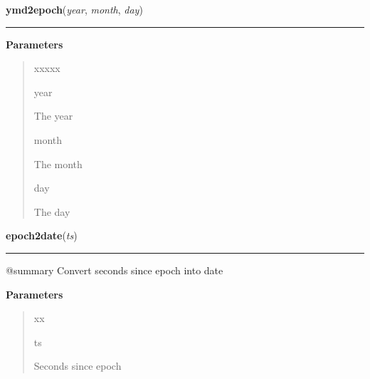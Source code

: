 \hspace{.8\funcindent}\begin{boxedminipage}{\funcwidth}

    \raggedright \textbf{ymd2epoch}(\textit{year}, \textit{month}, \textit{day})

    \vspace{-1.5ex}

    \rule{\textwidth}{0.5\fboxrule}
\setlength{\parskip}{2ex}
\setlength{\parskip}{1ex}
      \textbf{Parameters}
      \vspace{-1ex}

      \begin{quote}
        \begin{Ventry}{xxxxx}

          \item[year]

          The year

          \item[month]

          The month

          \item[day]

          The day

        \end{Ventry}

      \end{quote}

    \end{boxedminipage}

    \label{trunk:qstkutil:dateutil:epoch2date}

    \vspace{0.5ex}

\hspace{.8\funcindent}\begin{boxedminipage}{\funcwidth}

    \raggedright \textbf{epoch2date}(\textit{ts})

    \vspace{-1.5ex}

    \rule{\textwidth}{0.5\fboxrule}
\setlength{\parskip}{2ex}
    @summary Convert seconds since epoch into date

\setlength{\parskip}{1ex}
      \textbf{Parameters}
      \vspace{-1ex}

      \begin{quote}
        \begin{Ventry}{xx}

          \item[ts]

          Seconds since epoch

        \end{Ventry}

      \end{quote}

    \end{boxedminipage}


